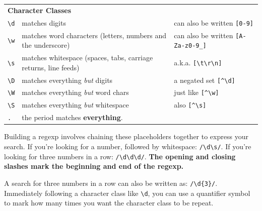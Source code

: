 \documentclass[10pt,twoside]{report}
\begin{document}
\begin{tabular}{p{}p{}p{}}
\multicolumn{3}{l}{\bf Character Classes }
\\ \lstinline[breaklines=true]|\d| & matches digits & can also be
written \lstinline[breaklines=true]|[0-9]|
\\ \lstinline[breaklines=true]|\w| & matches word characters (letters,
numbers and the underscore) & can also be written
\lstinline[breaklines=true]|[A-Za-z0-9_]|
\\ \lstinline[breaklines=true]|\s| & matches whitespace (spaces, tabs,
carriage returns, line feeds) & a.k.a. 
\lstinline[breaklines=true]|[\t\r\n]| \\ 
\lstinline[breaklines=true]|\D| & matches everything
{\em but} digits & a negated set \lstinline[breaklines=true]|[^\d]|
\\ \lstinline[breaklines=true]|\W| & matches everything {\em but} word
chars & just like \lstinline[breaklines=true]|[^\w]|
\\ \lstinline[breaklines=true]|\S| & matches everything {\em but}
whitespace & also \lstinline[breaklines=true]|[^\s]|
\\ \lstinline[breaklines=true]|.| & the period matches {\bf
  everything}. \\
\end{tabular}

Building a regexp involves chaining these placeholders together to
express your search.  If you're looking for a number, followed by
whitespace: \lstinline[breaklines=true]|/\d\s/|.  If you're looking
for three numbers in a row: \lstinline[breaklines=true]|/\d\d\d/|.
{\bf The opening and closing slashes mark the beginning and end of the
  regexp.}

A search for three numbers in a row can also be written as:
\lstinline[breaklines=true]|/\d{3}/|.  Immediately following a
character class like \lstinline[breaklines=true]|\d|, you can use a
quantifier symbol to mark how many times you want the character class
to be repeat.
\end{document}
